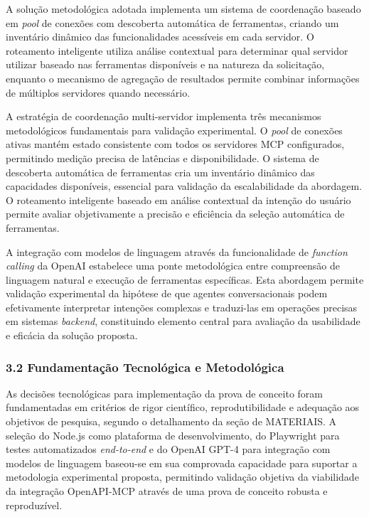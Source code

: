 \documentclass[
]{article}
\begin{document}
A solução metodológica adotada implementa um sistema de coordenação
baseado em \emph{pool} de conexões com descoberta automática de
ferramentas, criando um inventário dinâmico das funcionalidades
acessíveis em cada servidor. O roteamento inteligente utiliza análise
contextual para determinar qual servidor utilizar baseado nas
ferramentas disponíveis e na natureza da solicitação, enquanto o
mecanismo de agregação de resultados permite combinar informações de
múltiplos servidores quando necessário.

A estratégia de coordenação multi-servidor implementa três mecanismos
metodológicos fundamentais para validação experimental. O \emph{pool} de
conexões ativas mantém estado consistente com todos os servidores MCP
configurados, permitindo medição precisa de latências e disponibilidade.
O sistema de descoberta automática de ferramentas cria um inventário
dinâmico das capacidades disponíveis, essencial para validação da
escalabilidade da abordagem. O roteamento inteligente baseado em análise
contextual da intenção do usuário permite avaliar objetivamente a
precisão e eficiência da seleção automática de ferramentas.

A integração com modelos de linguagem através da funcionalidade de
\emph{function calling} da OpenAI estabelece uma ponte metodológica
entre compreensão de linguagem natural e execução de ferramentas
específicas. Esta abordagem permite validação experimental da hipótese
de que agentes conversacionais podem efetivamente interpretar intenções
complexas e traduzi-las em operações precisas em sistemas
\emph{backend}, constituindo elemento central para avaliação da
usabilidade e eficácia da solução proposta.

\subsubsection{3.2 Fundamentação Tecnológica e
Metodológica}\label{fundamentauxe7uxe3o-tecnoluxf3gica-e-metodoluxf3gica}

As decisões tecnológicas para implementação da prova de conceito foram
fundamentadas em critérios de rigor científico, reprodutibilidade e
adequação aos objetivos de pesquisa, segundo o detalhamento da seção de
MATERIAIS. A seleção do Node.js como plataforma de desenvolvimento, do
Playwright para testes automatizados \emph{end-to-end} e do OpenAI GPT-4
para integração com modelos de linguagem baseou-se em sua comprovada
capacidade para suportar a metodologia experimental proposta, permitindo
validação objetiva da viabilidade da integração OpenAPI-MCP através de
uma prova de conceito robusta e reproduzível.
\end{document}
